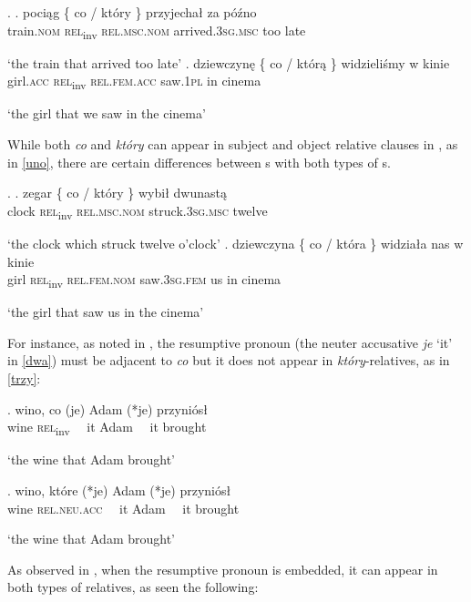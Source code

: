 \ex. \label{Pol:inv-co}
\ag. 
poci\k{a}g \{ co / {kt\'ory \}} przyjecha\l {} za p\'o\'zno\\
train.\textsc{nom} {} \textsc{rel}\textsubscript{inv} {} \textsc{rel.msc.nom}  arrived.\textsc{3sg.msc} too late\\
\strut `the train that arrived too late'
\bg.
dziewczyn\k{e} \{ co / {kt\'or\k{a} \}} widzieli\'smy w kinie\\
girl.\textsc{acc} {} \textsc{rel}\textsubscript{inv} {} \textsc{rel.fem.acc} saw.\textsc{1pl} in cinema\\
\strut `the girl that we saw in the cinema'  

While both \textit{co} and \textit{kt\'ory} can appear in subject and object relative clauses in , as in \ref{uno}, there are certain differences between s with both types of s.

\ex.\label{uno} 
\ag. zegar \{ co / {kt\'ory \}} wybi\l {} dwunast\k{a}\\
clock {} \textsc{rel}\textsubscript{inv} {} \textsc{rel.msc.nom} struck.\textsc{3sg.msc} twelve\\
\strut `the clock which struck twelve o'clock'
\bg.
dziewczyna \{ co / {kt\'ora \}} widzia\l a nas w kinie\\
girl {} \textsc{rel}\textsubscript{inv} {} \textsc{rel.fem.nom} saw.\textsc{3sg.fem} us in cinema\\
\strut `the girl that saw us in the cinema'  

For instance, as noted in \cite{Mykowiecka2001}, the resumptive pronoun (the neuter accusative \textit{je} `it' in \ref{dwa}) must be adjacent to \textit{co} but it does not appear in \textit{kt\'ory}-relatives, as in \ref{trzy}: 

\exg.
 wino, co (je) Adam (*je) przyni\'os\l\\
wine \textsc{rel}\textsubscript{inv} \ \ it Adam \ \ it brought\\
\strut `the wine that Adam brought'\label{dwa}

\exg.
wino, kt\'ore (*je) Adam (*je) przyni\'os\l\\
wine \textsc{rel.neu.acc} \ \ it Adam \ \ it brought\\
\strut `the wine that Adam brought'\label{trzy}

As observed in \cite{Szczegielniak2005}, when the resumptive pronoun is embedded, it can appear in both types of relatives, as seen the following:

